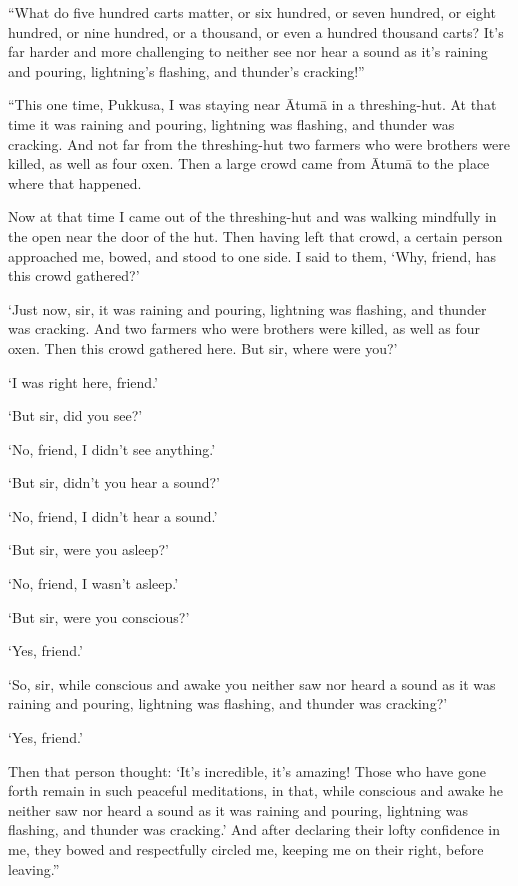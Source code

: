 \documentclass[12pt,openany]{book}%
\begin{document}
“What do five hundred carts matter, or six hundred, or seven hundred, or eight hundred, or nine hundred, or a thousand, or even a hundred thousand carts? It’s far harder and more challenging to neither see nor hear a sound as it’s raining and pouring, lightning’s flashing, and thunder’s cracking!” 

“This one time, Pukkusa, I was staying near \textsanskrit{Ātumā} in a threshing-hut. At that time it was raining and pouring, lightning was flashing, and thunder was cracking. And not far from the threshing-hut two farmers who were brothers were killed, as well as four oxen. Then a large crowd came from \textsanskrit{Ātumā} to the place where that happened. 

Now at that time I came out of the threshing-hut and was walking mindfully in the open near the door of the hut. Then having left that crowd, a certain person approached me, bowed, and stood to one side. I said to them, ‘Why, friend, has this crowd gathered?’ 

‘Just now, sir, it was raining and pouring, lightning was flashing, and thunder was cracking. And two farmers who were brothers were killed, as well as four oxen. Then this crowd gathered here. But sir, where were you?’ 

‘I was right here, friend.’ 

‘But sir, did you see?’ 

‘No, friend, I didn’t see anything.’ 

‘But sir, didn’t you hear a sound?’ 

‘No, friend, I didn’t hear a sound.’ 

‘But sir, were you asleep?’ 

‘No, friend, I wasn’t asleep.’ 

‘But sir, were you conscious?’ 

‘Yes, friend.’ 

‘So, sir, while conscious and awake you neither saw nor heard a sound as it was raining and pouring, lightning was flashing, and thunder was cracking?’ 

‘Yes, friend.’ 

Then that person thought: ‘It’s incredible, it’s amazing! Those who have gone forth remain in such peaceful meditations, in that, while conscious and awake he neither saw nor heard a sound as it was raining and pouring, lightning was flashing, and thunder was cracking.’ And after declaring their lofty confidence in me, they bowed and respectfully circled me, keeping me on their right, before leaving.” 
\end{document}
